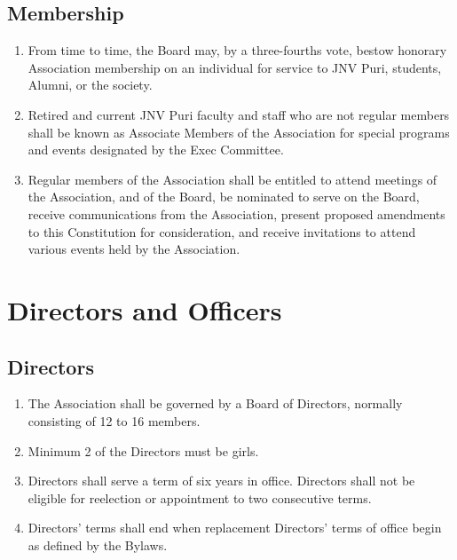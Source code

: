 \documentclass[a4paper,11pt]{book}
\begin{document}
\section{Membership}
\begin{enumerate}
\item From time to time, the Board may, by a three-fourths vote, 
bestow honorary Association membership on an individual for service to JNV Puri, 
students, Alumni, or the society.
\item Retired and current JNV Puri faculty and staff who are not regular members 
shall be known as Associate Members of the Association for special programs and 
events designated by the Exec Committee.
\item Regular members of the Association shall be entitled to attend meetings of 
the Association, and of the Board, be nominated to serve on the Board, receive 
communications from the Association, present proposed amendments to this 
Constitution for consideration, and receive invitations to attend various events 
held by the Association.
\end{enumerate}

\chapter{Directors and Officers}
\section{Directors}
\begin{enumerate}
\item The Association shall be governed by a Board of Directors, normally 
consisting of 12 to 16 members.
\item Minimum 2 of the Directors must be girls.
\item Directors shall serve a term of six years in office. Directors shall not be eligible for reelection or appointment to two consecutive terms.
\item Directors’ terms shall end when replacement Directors’ terms of office begin as defined by the Bylaws.
\end{enumerate}
\end{document}
